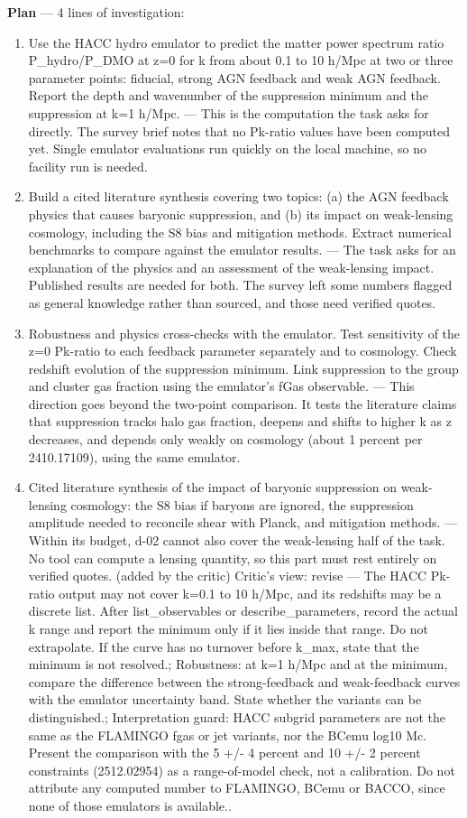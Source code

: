 \documentclass[11pt,a4paper]{article}
\begin{document}
\textbf{Plan} --- 4 lines of investigation:

\begin{enumerate}
  \item Use the HACC hydro emulator to predict the matter power spectrum ratio P\_hydro/P\_DMO at z=0 for k from about 0.1 to 10 h/Mpc at two or three parameter points: fiducial, strong AGN feedback and weak AGN feedback. Report the depth and wavenumber of the suppression minimum and the suppression at k=1 h/Mpc. --- This is the computation the task asks for directly. The survey brief notes that no Pk-ratio values have been computed yet. Single emulator evaluations run quickly on the local machine, so no facility run is needed.
  \item Build a cited literature synthesis covering two topics: (a) the AGN feedback physics that causes baryonic suppression, and (b) its impact on weak-lensing cosmology, including the S8 bias and mitigation methods. Extract numerical benchmarks to compare against the emulator results. --- The task asks for an explanation of the physics and an assessment of the weak-lensing impact. Published results are needed for both. The survey left some numbers flagged as general knowledge rather than sourced, and those need verified quotes.
  \item Robustness and physics cross-checks with the emulator. Test sensitivity of the z=0 Pk-ratio to each feedback parameter separately and to cosmology. Check redshift evolution of the suppression minimum. Link suppression to the group and cluster gas fraction using the emulator's fGas observable. --- This direction goes beyond the two-point comparison. It tests the literature claims that suppression tracks halo gas fraction, deepens and shifts to higher k as z decreases, and depends only weakly on cosmology (about 1 percent per 2410.17109), using the same emulator.
  \item Cited literature synthesis of the impact of baryonic suppression on weak-lensing cosmology: the S8 bias if baryons are ignored, the suppression amplitude needed to reconcile shear with Planck, and mitigation methods. --- Within its budget, d-02 cannot also cover the weak-lensing half of the task. No tool can compute a lensing quantity, so this part must rest entirely on verified quotes. (added by the critic)
Critic's view: revise --- The HACC Pk-ratio output may not cover k=0.1 to 10 h/Mpc, and its redshifts may be a discrete list. After list\_observables or describe\_parameters, record the actual k range and report the minimum only if it lies inside that range. Do not extrapolate. If the curve has no turnover before k\_max, state that the minimum is not resolved.; Robustness: at k=1 h/Mpc and at the minimum, compare the difference between the strong-feedback and weak-feedback curves with the emulator uncertainty band. State whether the variants can be distinguished.; Interpretation guard: HACC subgrid parameters are not the same as the FLAMINGO fgas or jet variants, nor the BCemu log10 Mc. Present the comparison with the 5 +/- 4 percent and 10 +/- 2 percent constraints (2512.02954) as a range-of-model check, not a calibration. Do not attribute any computed number to FLAMINGO, BCemu or BACCO, since none of those emulators is available..


\end{enumerate}
\end{document}

